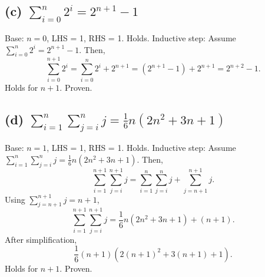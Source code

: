 \documentclass[9pt]{article}
\begin{document}
\subsection*{(c) \( \sum_{i=0}^{n} 2^i = 2^{n+1} - 1 \)}
Base: \( n=0 \), LHS = 1, RHS = 1. Holds. \newline
Inductive step: Assume \( \sum_{i=0}^{n} 2^i = 2^{n+1} - 1 \). Then,
\[ \sum_{i=0}^{n+1} 2^i = \sum_{i=0}^{n} 2^i + 2^{n+1} = (2^{n+1} - 1) + 2^{n+1} = 2^{n+2} - 1. \]
Holds for \( n+1 \). Proven.

\subsection*{(d) \( \sum_{i=1}^{n} \sum_{j=i}^{n} j = \frac{1}{6} n(2n^2+3n+1) \)}
Base: \( n=1 \), LHS = 1, RHS = 1. Holds. \newline
Inductive step: Assume \( \sum_{i=1}^{n} \sum_{j=i}^{n} j = \frac{1}{6} n(2n^2+3n+1) \). Then,
\[ \sum_{i=1}^{n+1} \sum_{j=i}^{n+1} j = \sum_{i=1}^{n} \sum_{j=i}^{n} j + \sum_{j=n+1}^{n+1} j. \]
Using \( \sum_{j=n+1}^{n+1} j = n+1 \),
\[ \sum_{i=1}^{n+1} \sum_{j=i}^{n+1} j = \frac{1}{6} n(2n^2+3n+1) + (n+1). \]
After simplification,
\[ \frac{1}{6} (n+1)(2(n+1)^2+3(n+1)+1). \]
Holds for \( n+1 \). Proven.
\end{document}
